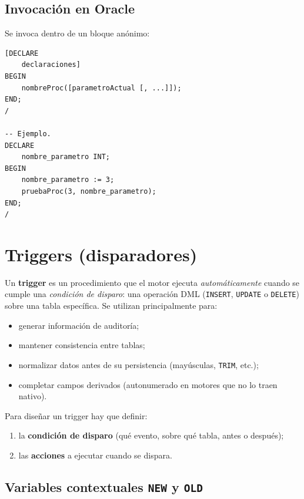 \documentclass[11pt,a4paper]{article}
\begin{document}
\subsection{Invocación en Oracle}

Se invoca dentro de un bloque anónimo:

\begin{lstlisting}
[DECLARE
    declaraciones]
BEGIN
    nombreProc([parametroActual [, ...]]);
END;
/

-- Ejemplo.
DECLARE
    nombre_parametro INT;
BEGIN
    nombre_parametro := 3;
    pruebaProc(3, nombre_parametro);
END;
/
\end{lstlisting}

\section{Triggers (disparadores)}

Un \textbf{trigger} es un procedimiento que el motor ejecuta
\emph{automáticamente} cuando se cumple una \emph{condición de
disparo}: una operación DML (\texttt{INSERT}, \texttt{UPDATE} o
\texttt{DELETE}) sobre una tabla específica. Se utilizan
principalmente para:

\begin{itemize}
    \item generar información de auditoría;
    \item mantener consistencia entre tablas;
    \item normalizar datos antes de su persistencia (mayúsculas,
    \texttt{TRIM}, etc.);
    \item completar campos derivados (autonumerado en motores que no
    lo traen nativo).
\end{itemize}

Para diseñar un trigger hay que definir:

\begin{enumerate}
    \item la \textbf{condición de disparo} (qué evento, sobre qué
    tabla, antes o después);
    \item las \textbf{acciones} a ejecutar cuando se dispara.
\end{enumerate}

\subsection{Variables contextuales \texttt{NEW} y \texttt{OLD}}
\end{document}
